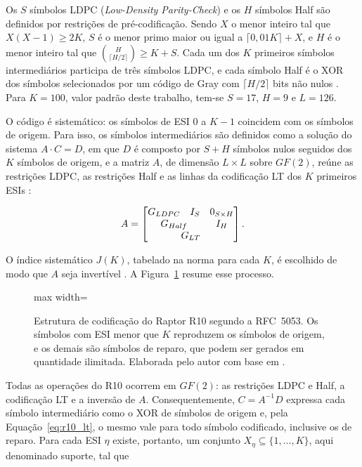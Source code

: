 Os $S$ símbolos LDPC (\emph{Low-Density Parity-Check}) e os $H$ símbolos Half são definidos por restrições de pré-codificação. Sendo $X$ o menor inteiro tal que $X(X-1) \ge 2K$, $S$ é o menor primo maior ou igual a $\lceil 0{,}01K \rceil + X$, e $H$ é o menor inteiro tal que $\binom{H}{\lceil H/2 \rceil} \ge K + S$. Cada um dos $K$ primeiros símbolos intermediários participa de três símbolos LDPC, e cada símbolo Half é o XOR dos símbolos selecionados por um código de Gray com $\lceil H/2 \rceil$ bits não nulos \cite{luby2007rfc5053}. Para $K = 100$, valor padrão deste trabalho, tem-se $S = 17$, $H = 9$ e $L = 126$.

O código é sistemático: os símbolos de \acrshort{ESI} $0$ a $K - 1$ coincidem com os símbolos de origem. Para isso, os símbolos intermediários são definidos como a solução do sistema $A \cdot C = D$, em que $D$ é composto por $S + H$ símbolos nulos seguidos dos $K$ símbolos de origem, e a matriz $A$, de dimensão $L \times L$ sobre $GF(2)$, reúne as restrições LDPC, as restrições Half e as linhas da codificação LT dos $K$ primeiros \acrshort{ESI}s \cite{luby2007rfc5053}:

\begin{equation}
A = \begin{bmatrix}
G_{LDPC} & I_S & 0_{S \times H} \\
\multicolumn{2}{c}{G_{Half}} & I_H \\
\multicolumn{3}{c}{G_{LT}}
\end{bmatrix}.
\label{eq:r10_matriz}
\end{equation}

O índice sistemático $J(K)$, tabelado na norma para cada $K$, é escolhido de modo que $A$ seja invertível \cite{luby2007rfc5053}. A Figura~\ref{fig:raptor_r10} resume esse processo.

\begin{figure}[htbp]
	\centering
	\begin{adjustbox}{max width=\textwidth}
		
	\end{adjustbox}
	\caption{Estrutura de codificação do Raptor R10 segundo a RFC~5053. Os símbolos com \acrshort{ESI} menor que $K$ reproduzem os símbolos de origem, e os demais são símbolos de reparo, que podem ser gerados em quantidade ilimitada. Elaborada pelo autor com base em \cite{luby2007rfc5053}.}
	\label{fig:raptor_r10}
\end{figure}

Todas as operações do R10 ocorrem em $GF(2)$: as restrições LDPC e Half, a codificação LT e a inversão de $A$. Consequentemente, $C = A^{-1} D$ expressa cada símbolo intermediário como o XOR de símbolos de origem e, pela Equação~\eqref{eq:r10_lt}, o mesmo vale para todo símbolo codificado, inclusive os de reparo. Para cada \acrshort{ESI} $\eta$ existe, portanto, um conjunto $X_\eta \subseteq \{1, \ldots, K\}$, aqui denominado suporte, tal que

